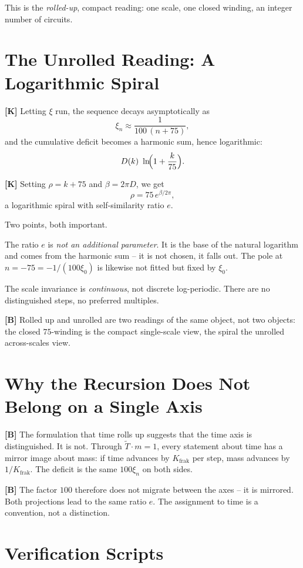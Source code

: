 This is the \emph{rolled-up}, compact reading: one scale, one closed winding,
an integer number of circuits.

\section{The Unrolled Reading: A Logarithmic Spiral}

\textbf{[K]} Letting $\xi$ run, the sequence decays asymptotically as
\[
  \xi_n \approx \frac{1}{100\,(n+75)} ,
\]
and the cumulative deficit becomes a harmonic sum, hence logarithmic:
\[
  D(k) \approx \ln\!\Bigl(1 + \frac{k}{75}\Bigr).
\]

\textbf{[K]} Setting $\rho = k + 75$ and $\beta = 2\pi D$, we get
\[
  \rho = 75\,e^{\beta/2\pi} ,
\]
a logarithmic spiral with self-similarity ratio $e$.

Two points, both important.

The ratio $e$ is \emph{not an additional parameter}. It is the base of the
natural logarithm and comes from the harmonic sum -- it is not chosen, it falls
out. The pole at $n = -75 = -1/(100\xi_0)$ is likewise not fitted but fixed
by $\xi_0$.

The scale invariance is \emph{continuous}, not discrete log-periodic. There are
no distinguished steps, no preferred multiples.

\textbf{[B]} Rolled up and unrolled are two readings of the same object, not
two objects: the closed $75$-winding is the compact single-scale view, the
spiral the unrolled across-scales view.

\section{Why the Recursion Does Not Belong on a Single Axis}

\textbf{[B]} The formulation that time rolls up suggests that the time axis is
distinguished. It is not. Through $\tilde T\cdot m = 1$, every statement about
time has a mirror image about mass: if time advances by $K_\text{frak}$ per
step, mass advances by $1/K_\text{frak}$. The deficit is the same $100\xi_n$
on both sides.

\textbf{[B]} The factor $100$ therefore does not migrate between the axes -- it
is mirrored. Both projections lead to the same ratio $e$. The assignment to time
is a convention, not a distinction.

\section{Verification Scripts}

